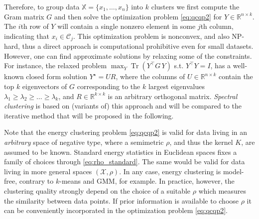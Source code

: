 \documentclass[twoside]{article}
\DeclareMathOperator{\Tr}{Tr}
\newcommand\kk{K}
\newcommand\C{{\mathcal{C}}}
\newcommand\Zt{Y}
\begin{document}
Therefore, to group data
$\mathbb{X} = \{ x_1,\dotsc,x_n \}$
into  $k$ clusters we first compute the Gram matrix
$G$ and then 
solve the optimization problem \eqref{eq:qcqp2} for $\Zt \in
\mathbb{R}^{n\times k}$. The $i$th row
of $\Zt$ will contain a single nonzero element in some $j$th column,
indicating that $x_i \in \C_j$. 
This optimization problem is nonconvex, and also NP-hard,
thus a direct approach 
is computational prohibitive even for small datasets.
However, one can find approximate solutions by relaxing some 
of the constraints.
For instance, the relaxed problem
$\max_{Y} \Tr \left( Y^\top G \, Y \right)$ s.t. $Y^\top Y = I$,
has a well-known closed form solution $Y^\star = U R$, where the
columns of $U \in \mathbb{R}^{n\times k}$ 
contain the top $k$ eigenvectors of $G$ corresponding
to the $k$ largest eigenvalues $\lambda_1\ge \lambda_2\ge\dotsc\ge\lambda_k$, 
and
$R \in \mathbb{R}^{k\times k}$ is an arbitrary orthogonal matrix. 
\emph{Spectral clustering} is based on (variants of) this approach 
and will be compared to the iterative method that will be proposed 
in the following.

Note that the energy clustering problem \eqref{eq:qcqp2} 
is valid for data living in an \emph{arbitrary} space of negative type, where
a semimetric $\rho$, and thus the kernel $\kk$, are
assumed to be known. Standard energy statistics in
Euclidean spaces fixes a family of choices through 
\eqref{eq:rho_standard}.
The same would be valid for data living in more general
spaces $(\mathcal{X}, \rho)$.
In any case, energy  clustering 
is model-free, 
contrary to $k$-means and GMM, for example.
In practice, however,
the clustering quality strongly depend on the choice of a suitable
$\rho$ which measures the similarity between data points.
If prior information is available to choose $\rho$
it can be conveniently incorporated in the 
optimization problem \eqref{eq:qcqp2}.
\end{document}
